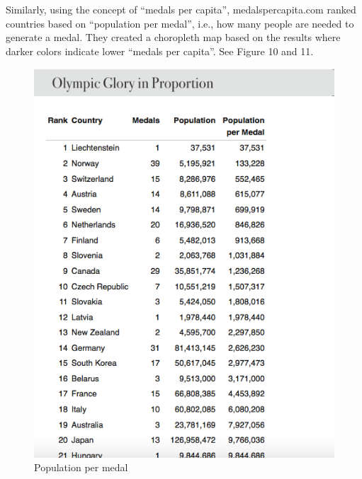 \documentclass[12pt]{article}
\begin{document}
Similarly, using the concept of “medals per capita”, medalspercapita.com ranked countries based on “population per medal”, i.e., how many people are needed to generate a medal. They created a choropleth map based on the results where darker colors indicate lower “medals per capita”. See Figure 10 and 11. 

\begin{figure}[!b]
  \begin{minipage}[b]{0.45\textwidth}
  \centering
    \includegraphics[scale=0.29]{pics/3-5.png}
    \caption{\footnotesize Population per medal}
    \label{fig:1}
  \end{minipage}
  \hfill
  \begin{minipage}[b]{0.45\textwidth}
  \centering

\end{minipage}
\end{figure}
\end{document}
